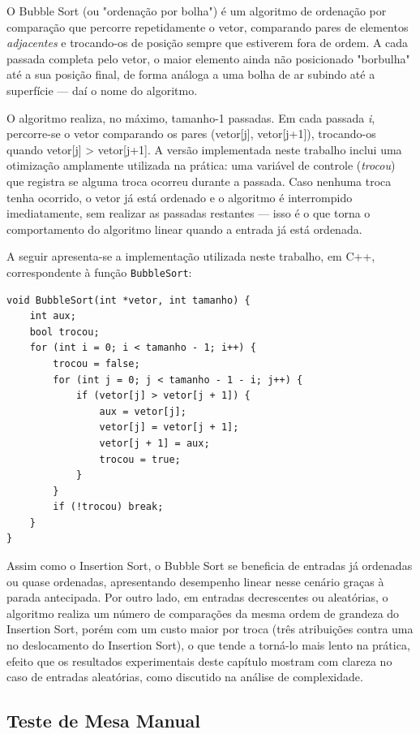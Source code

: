 \qquad O Bubble Sort (ou "ordenação por bolha") é um algoritmo de ordenação
por comparação que percorre repetidamente o vetor, comparando pares de
elementos \textit{adjacentes} e trocando-os de posição sempre que
estiverem fora de ordem. A cada passada completa pelo vetor, o maior
elemento ainda não posicionado "borbulha" até a sua posição final, de
forma análoga a uma bolha de ar subindo até a superfície — daí o nome
do algoritmo.

\qquad O algoritmo realiza, no máximo, tamanho-1 passadas. Em cada passada
\textit{i}, percorre-se o vetor comparando os pares (vetor[j],
vetor[j+1]), trocando-os quando vetor[j] > vetor[j+1]. A versão
implementada neste trabalho inclui uma otimização amplamente utilizada
na prática: uma variável de controle (\textit{trocou}) que registra se
alguma troca ocorreu durante a passada. Caso nenhuma troca tenha
ocorrido, o vetor já está ordenado e o algoritmo é interrompido
imediatamente, sem realizar as passadas restantes — isso é o que
torna o comportamento do algoritmo linear quando a entrada já está
ordenada.

\qquad A seguir apresenta-se a implementação utilizada neste trabalho, em
C++, correspondente à função \texttt{BubbleSort}:

\begin{verbatim}
void BubbleSort(int *vetor, int tamanho) {
    int aux;
    bool trocou;
    for (int i = 0; i < tamanho - 1; i++) {
        trocou = false;
        for (int j = 0; j < tamanho - 1 - i; j++) {
            if (vetor[j] > vetor[j + 1]) {
                aux = vetor[j];
                vetor[j] = vetor[j + 1];
                vetor[j + 1] = aux;
                trocou = true;
            }
        }
        if (!trocou) break;
    }
}
\end{verbatim}

\qquad Assim como o Insertion Sort, o Bubble Sort se beneficia de entradas
já ordenadas ou quase ordenadas, apresentando desempenho linear nesse
cenário graças à parada antecipada. Por outro lado, em entradas
decrescentes ou aleatórias, o algoritmo realiza um número de
comparações da mesma ordem de grandeza do Insertion Sort, porém com um
custo maior por troca (três atribuições contra uma no deslocamento do
Insertion Sort), o que tende a torná-lo mais lento na prática, efeito que os resultados experimentais deste capítulo mostram com clareza no caso de entradas aleatórias, como discutido na análise de complexidade.

\subsection{Teste de Mesa Manual}

